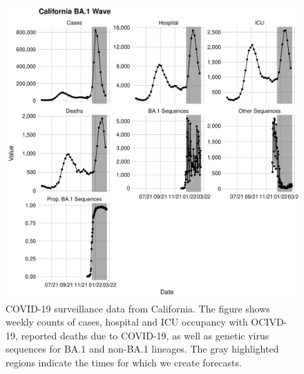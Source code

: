 \begin{figure}
    \centering
    \includegraphics[width=1.0\columnwidth]{california_binned_data_plot.pdf}
    \caption[COVID-19 surveillance data from California.]{
COVID-19 surveillance data from California.
The figure shows weekly counts of cases, hospital and ICU occupancy with OCIVD-19, reported deaths due to COVID-19, as well as genetic virus sequences for BA.1 and non-BA.1 lineages.
The gray highlighted regions indicate the times for which we create forecasts.}
    \label{ch_5:fig:california_binned_data_plot}
\end{figure}

